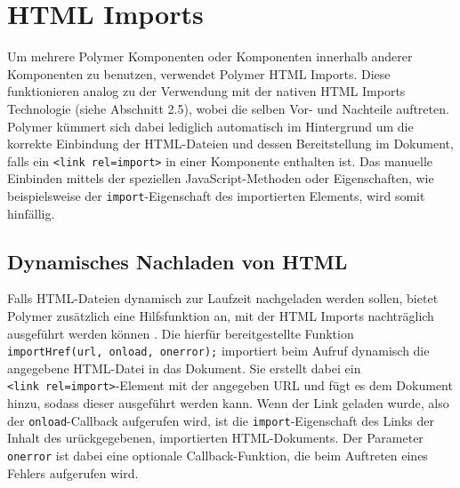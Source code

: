\begin{Shaded}
\begin{Highlighting}[]
\KeywordTok{>}
\KeywordTok{>}
    \KeywordTok{>}
  \NormalTok{(}\OperatorTok{\{}\OperatorTok{:} \OperatorTok{\}}\NormalTok{)}\OperatorTok{;<}
\OperatorTok{-}\OperatorTok{>}
\end{Highlighting}
\end{Shaded}


\section{HTML Imports}\label{html-imports}

Um mehrere Polymer Komponenten oder Komponenten innerhalb anderer Komponenten zu benutzen, verwendet Polymer HTML Imports. Diese funktionieren analog zu der Verwendung mit der nativen HTML Imports Technologie (siehe Abschnitt 2.5), wobei die selben Vor- und Nachteile auftreten. Polymer kümmert sich dabei lediglich automatisch im Hintergrund um die korrekte Einbindung der HTML-Dateien und dessen Bereitstellung im Dokument, falls ein \texttt{\textless{}link\ rel=\dq import\dq\textgreater{}} in einer Komponente enthalten ist. Das manuelle Einbinden mittels der speziellen JavaScript-Methoden oder Eigenschaften, wie beispielsweise der \texttt{import}-Eigenschaft des importierten Elements, wird somit hinfällig.

\subsection{Dynamisches Nachladen von HTML}\label{dynamisches-nachladen-von-html}

Falls HTML-Dateien dynamisch zur Laufzeit nachgeladen werden sollen, bietet Polymer zusätzlich eine Hilfsfunktion an, mit der HTML Imports nachträglich ausgeführt werden können \cite{citeulike:13914840}. Die hierfür bereitgestellte Funktion \texttt{importHref(url,\ onload,\ onerror);} importiert beim Aufruf dynamisch die angegebene HTML-Datei in das Dokument. Sie erstellt dabei ein \texttt{\textless{}link\ rel=\dq import\dq\textgreater{}}-Element mit der angegeben URL und fügt es dem Dokument hinzu, sodass dieser ausgeführt werden kann. Wenn der Link geladen wurde, also der \texttt{onload}-Callback aufgerufen wird, ist die \texttt{import}-Eigenschaft des Links der Inhalt des  urückgegebenen, importierten HTML-Dokuments. Der Parameter \texttt{onerror} ist dabei eine optionale Callback-Funktion, die beim Auftreten eines Fehlers aufgerufen wird.
